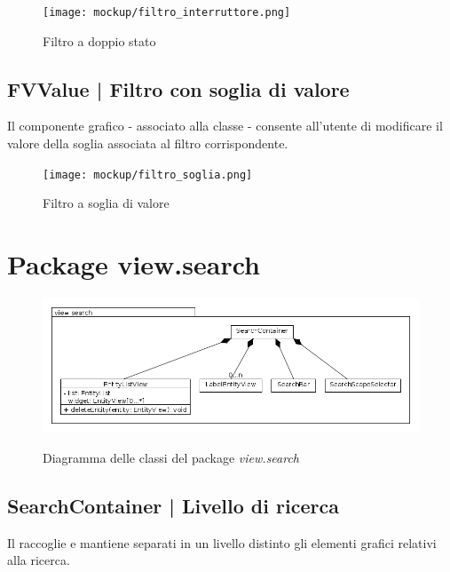 \documentclass[10pt,a4paper,headinclude,footinclude,hidelinks]{scrreprt} %
\begin{document}
	\begin{figure}[ht]
		\begin{center}
	    	\texttt{[image: mockup/filtro\_interruttore.png]}
			\label{gfx:mockup:filter:switch}
			\caption{Filtro a doppio stato}
		\end{center}
	\end{figure}

	\subsection[FVValue]{FVValue | Filtro con soglia di valore}
	\label{sec:stage:design:view.filter:value-filter}
	Il componente grafico - associato alla classe \textit{} - consente all'utente di modificare il valore della soglia associata al filtro corrispondente.

	\begin{figure}[ht]
		\begin{center}
	    	\texttt{[image: mockup/filtro\_soglia.png]}
			\label{gfx:mockup:filter:value}
			\caption{Filtro a soglia di valore}
		\end{center}
	\end{figure}

	\section{Package view.search}
	\label{sec:stage:design:view.search}

	\begin{figure}[ht]
		\begin{center}
	    	\includegraphics[width=12cm]{class/view_search.png}
			\label{gfx:class:view:search}
			\caption{Diagramma delle classi del package \textit{view.search}}
		\end{center}
	\end{figure}

	\subsection[SearchContainer]{SearchContainer | Livello di ricerca}
	\label{sec:stage:design:view.search:search-container}
	Il \textit{} raccoglie e mantiene separati in un livello distinto gli elementi grafici relativi alla ricerca.
\end{document}
